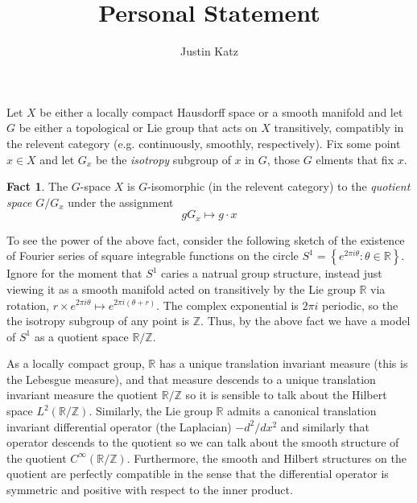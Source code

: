 \documentclass[11pt]{article} %
\title{Personal Statement}
\author{Justin Katz}
\theoremstyle{definition}
\newtheorem*{fact}{Fact}
\begin{document}
\maketitle
Let $X$ be either a locally compact Hausdorff space or a smooth manifold and let $G$ be either a topological or Lie group that acts on $X$ transitively, compatibly in the relevent category (e.g. continuously, smoothly, respectively). Fix some point $x\in X$ and let $G_x$ be the \emph{isotropy} subgroup of $x$ in $G$, those $G$ elments that fix $x$.

\begin{fact}
The $G$-space $X$  is $G$-isomorphic (in the relevent category) to the \emph{quotient space} $G/G_x$ under the assignment
	\begin{equation*}
		gG_x \longmapsto g \cdot x
	\end{equation*}
\end{fact}

To see the power of the above fact, consider the following sketch of the existence of Fourier series of square integrable functions on the circle $S^1=\left \{e^{2\pi i \theta}:\theta \in \mathbb{R} \right \}$. Ignore for the moment that $S^1$ caries a natrual group structure, instead just viewing it as a smooth manifold acted on transitively by the Lie group $\mathbb{R}$ via rotation, $r \times e^{2\pi i\theta}\mapsto e^{2\pi i (\theta+r)}$. The complex exponential is $2\pi i$ periodic, so the the isotropy subgroup of any point is $\mathbb{Z}$. Thus, by the above fact we have a model of $S^1$ as a quotient space $\mathbb{R}/\mathbb{Z}$. 

As a locally compact group, $\mathbb{R}$ has a unique translation invariant measure (this is the Lebesgue measure), and that measure descends to a unique translation invariant measure the quotient $\mathbb{R}/\mathbb{Z}$ so it is sensible to talk about the Hilbert space $L^2(\mathbb{R}/\mathbb{Z})$. Similarly, the Lie group $\mathbb{R}$ admits a canonical translation invariant differential operator (the Laplacian) $-d^2/dx^2$ and similarly that operator descends to the quotient so we can talk about the smooth structure of the quotient $C^\infty(\mathbb{R}/\mathbb{Z})$.  Furthermore, the smooth and Hilbert structures on the quotient are perfectly compatible in the sense that the differential operator is symmetric and positive with respect to the inner product. 
\end{document}
